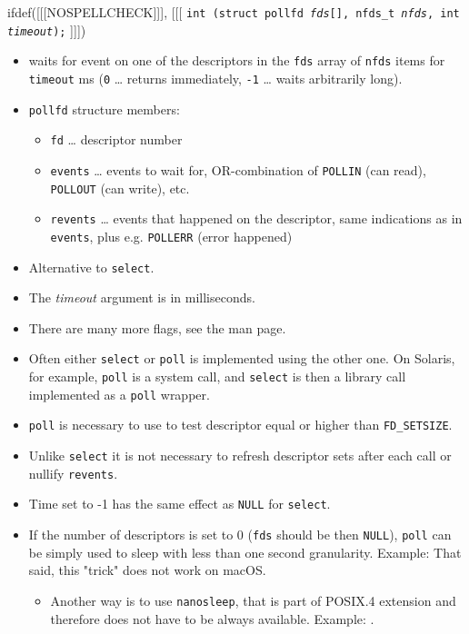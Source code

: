 \begin{slide}
ifdef([[[NOSPELLCHECK]]], [[[
\texttt{int (struct pollfd \emph{fds}[], nfds\_t \emph{nfds},
int \emph{timeout});}
]]])
\begin{itemize}
\item waits for event on one of the descriptors in the \texttt{fds} array
of \texttt{nfds} items for \texttt{timeout} ms (\texttt{0}
\dots{} returns immediately, \texttt{-1} \dots{} waits arbitrarily long).
\item \texttt{pollfd} structure members:
    \begin{itemize}
    \item \texttt{fd} \dots{} descriptor number
    \item \texttt{events} \dots{} events to wait for, OR-combination of
    \texttt{POLLIN} (can read), \texttt{POLLOUT} (can write), etc. 
    \item \texttt{revents} \dots{} events that happened on the descriptor,
    same indications as in \texttt{events}, plus e.g. \texttt{POLLERR}
    (error happened)
    \end{itemize}
\end{itemize}
\end{slide}

\label{POLL}

\begin{itemize}
\item Alternative to \texttt{select}.
\item The \emph{timeout} argument is in milliseconds.
\item There are many more flags, see the man page.
\item Often either \texttt{select} or \texttt{poll} is implemented using the
other one.  On Solaris, for example, \texttt{poll} is a system call, and
\texttt{select} is then a library call implemented as a \texttt{poll} wrapper.
\item \texttt{poll} is necessary to use to test descriptor equal or higher than
\texttt{FD\_SETSIZE}. 
\item Unlike \texttt{select} it is not necessary to refresh descriptor sets
after each call or nullify \texttt{revents}.
\item Time set to -1 has the same effect as \texttt{NULL} for \texttt{select}.
\item If the number of descriptors is set to 0 (\texttt{fds} should be then
\texttt{NULL}), \texttt{poll} can be simply used to sleep with less than one
second granularity. Example: \label{POLL_SLEEP_C} 
That said, this "trick" does not work on macOS.
\begin{itemize}
\item Another way is to use \texttt{nanosleep}, that is part of POSIX.4
extension and therefore does not have to be always available.
Example: .
\end{itemize}
\end{itemize}

\endinput
